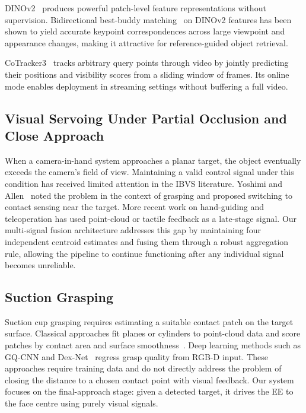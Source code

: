 \documentclass[lettersize,journal]{IEEEtran}
\begin{document}
DINOv2~\cite{oquab2023dinov2} produces powerful patch-level feature
representations without supervision.  Bidirectional best-buddy
matching~\cite{amir2022deep} on DINOv2 features has been shown to yield
accurate keypoint correspondences across large viewpoint and appearance
changes, making it attractive for reference-guided object retrieval.

CoTracker3~\cite{karaev2024cotracker3} tracks arbitrary query points through
video by jointly predicting their positions and visibility scores from a
sliding window of frames.  Its online mode enables deployment in streaming
settings without buffering a full video.

\subsection{Visual Servoing Under Partial Occlusion and Close Approach}

When a camera-in-hand system approaches a planar target, the object
eventually exceeds the camera's field of view.  Maintaining a valid control
signal under this condition has received limited attention in the IBVS
literature.  Yoshimi and Allen~\cite{yoshimi1994active} noted the problem in
the context of grasping and proposed switching to contact sensing near the
target.  More recent work on hand-guiding and teleoperation has used
point-cloud or tactile feedback as a late-stage signal.  Our multi-signal
fusion architecture addresses this gap by maintaining four independent
centroid estimates and fusing them through a robust aggregation rule,
allowing the pipeline to continue functioning after any individual signal
becomes unreliable.

\subsection{Suction Grasping}

Suction cup grasping requires estimating a suitable contact patch on the
target surface.  Classical approaches fit planes or cylinders to point-cloud
data and score patches by contact area and surface
smoothness~\cite{mahler2017dex}.  Deep learning methods such as GQ-CNN and
Dex-Net~\cite{mahler2019learning} regress grasp quality from RGB-D input.
These approaches require training data and do not directly address the
problem of closing the distance to a chosen contact point with visual
feedback.  Our system focuses on the final-approach stage: given a detected
target, it drives the EE to the face centre using purely visual signals.
\end{document}
